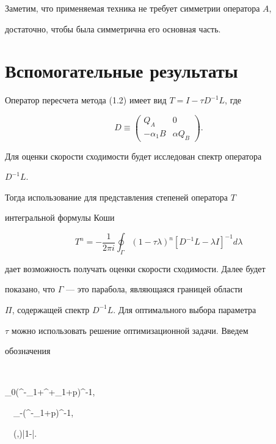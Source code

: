Заметим, что применяемая техника не требует симметрии оператора $A$, 


достаточно, чтобы была симметрична его основная часть. 


 


\section{Вспомогательные результаты} 


 


Оператор пересчета метода (1.2) имеет вид $T=I-\tau D^{-1}L$, где 


$$ 


D\equiv 


\begin{pmatrix} 


Q_A & 0 \\ -\alpha_1B & \alpha Q_B 


\end{pmatrix} 


. 


$$ 


Для оценки скорости сходимости будет исследован спектр оператора 


$D^{-1}L$. 


Тогда использование для представления степеней оператора $T$ 


интегральной формулы Коши 


$$ 


T^n=-\frac{1}{2\pi i}\oint_\Gamma(1-\tau\lambda)^n 


[D^{-1}L-\lambda I]^{-1}d\lambda 


$$ 


дает возможность получать оценки скорости сходимости. Далее будет 


показано, что $\Gamma$ --- это парабола, являющаяся границей области 


$\Pi$, содержащей спектр $D^{-1}L$. Для оптимального выбора параметра 


$\tau$ можно использовать решение оптимизационной задачи. Введем 


обозначения


$$


\tau_0(\lambda^-_1+\lambda^+_1+p)^{-1}, 


\ \ \tau_-\equiv(\lambda^-_1+p)^{-1}, 


\ \ \rho(\tau,\lambda)\equiv|1-\tau\lambda|. 


